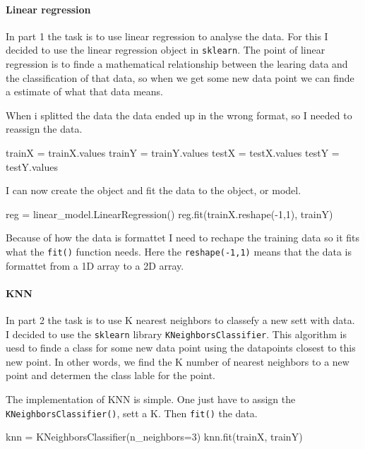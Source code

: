 \documentclass[11pt]{article}
\begin{document}
        \paragraph{Linear regression}
        In part 1 the task is to use linear regression to analyse the data. For this I decided to use the linear regression object in \texttt{sklearn}. The point of linear regression is to finde a mathematical relationship between the learing data and the classification of that data, so when we get some new data point we can finde a estimate of what that data means.
        
        When i splitted the data the data ended up in the wrong format, so I needed to reassign the data.

        \begin{pythoncode}
    trainX = trainX.values
    trainY = trainY.values
    testX = testX.values
    testY = testY.values
        \end{pythoncode}

        I can now create the object and fit the data to the object, or model.

        \begin{pythoncode}
    reg = linear_model.LinearRegression()
    reg.fit(trainX.reshape(-1,1), trainY)
        \end{pythoncode}

        Because of how the data is formattet I need to rechape the training data so it fits what the \texttt{fit()} function needs. Here the \texttt{reshape(-1,1)} means that the data is formattet from a 1D array to a 2D array.

        \paragraph{KNN}
        In part 2 the task is to use K nearest neighbors to classefy a new sett with data. I decided to use the \texttt{sklearn} library \texttt{KNeighborsClassifier}. This algorithm is uesd to finde a class for some new data point using the datapoints closest to this new point. In other words, we find the K number of nearest neighbors to a new point and determen the class lable for the point.

        The implementation of KNN is simple. One just have to assign the \texttt{KNeighborsClassifier()}, sett a K. Then \texttt{fit()} the data. 

        \begin{pythoncode}
    knn = KNeighborsClassifier(n_neighbors=3)
    knn.fit(trainX, trainY)
        \end{pythoncode}
\end{document}
